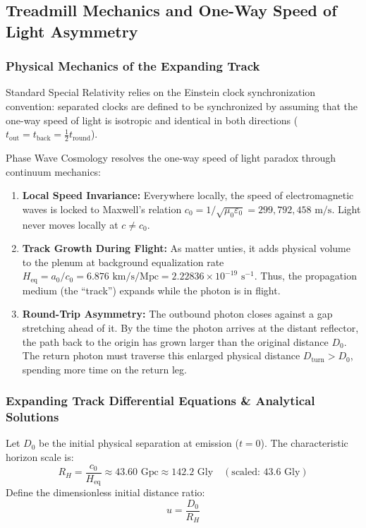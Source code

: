 \documentclass[11pt,a4paper]{article}
\begin{document}
\subsection{Treadmill Mechanics and One-Way Speed of Light Asymmetry}
\label{subsec:treadmill_mechanics}

\subsubsection{Physical Mechanics of the Expanding Track}
\label{subsubsec:treadmill_physics}

Standard Special Relativity relies on the Einstein clock synchronization convention: separated clocks are defined to be synchronized by assuming that the one-way speed of light is isotropic and identical in both directions ($t_{\text{out}} = t_{\text{back}} = \frac{1}{2} t_{\text{round}}$).

Phase Wave Cosmology resolves the one-way speed of light paradox through continuum mechanics:
\begin{enumerate}
    \item \textbf{Local Speed Invariance:} Everywhere locally, the speed of electromagnetic waves is locked to Maxwell's relation $c_0 = 1/\sqrt{\mu_0\varepsilon_0} = 299,792,458\text{ m/s}$. Light never moves locally at $c \ne c_0$.
    \item \textbf{Track Growth During Flight:} As matter unties, it adds physical volume to the plenum at background equalization rate $H_{\text{eq}} = a_0 / c_0 = 6.876\text{ km/s/Mpc} = 2.22836 \times 10^{-19}\text{ s}^{-1}$. Thus, the propagation medium (the ``track'') expands while the photon is in flight.
    \item \textbf{Round-Trip Asymmetry:} The outbound photon closes against a gap stretching ahead of it. By the time the photon arrives at the distant reflector, the path back to the origin has grown larger than the original distance $D_0$. The return photon must traverse this enlarged physical distance $D_{\text{turn}} > D_0$, spending more time on the return leg.
\end{enumerate}

\subsubsection{Expanding Track Differential Equations \& Analytical Solutions}
\label{subsubsec:treadmill_equations}

Let $D_0$ be the initial physical separation at emission ($t=0$). The characteristic horizon scale is:
\begin{equation}
R_H = \frac{c_0}{H_{\text{eq}}} \approx 43.60\text{ Gpc} \approx 142.2\text{ Gly} \quad (\text{scaled: } 43.6\text{ Gly})
\end{equation}
Define the dimensionless initial distance ratio:
\begin{equation}
u = \frac{D_0}{R_H}
\end{equation}
\end{document}
